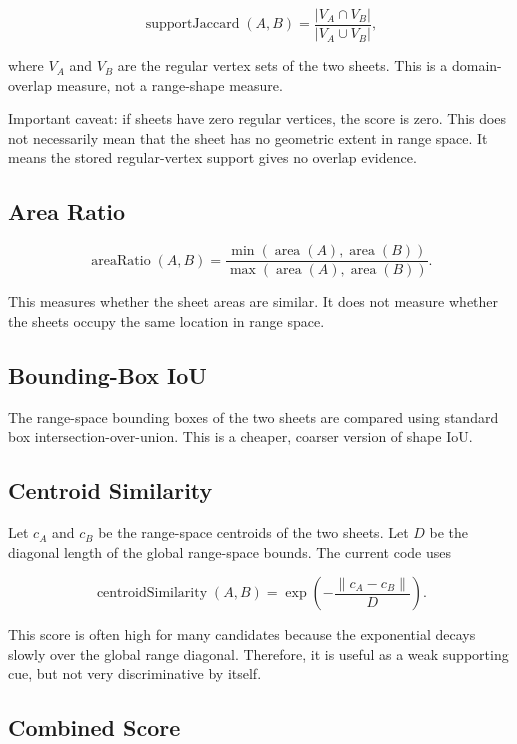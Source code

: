 \documentclass[11pt]{article}
\begin{document}
\[
\operatorname{supportJaccard}(A,B)
=
\frac{|V_A \cap V_B|}{|V_A \cup V_B|},
\]

where \(V_A\) and \(V_B\) are the regular vertex sets of the two sheets. This is
a domain-overlap measure, not a range-shape measure.

Important caveat: if sheets have zero regular vertices, the score is zero. This
does not necessarily mean that the sheet has no geometric extent in range
space. It means the stored regular-vertex support gives no overlap evidence.

\subsection{Area Ratio}

\[
\operatorname{areaRatio}(A,B)
=
\frac{\min(\operatorname{area}(A),\operatorname{area}(B))}
       {\max(\operatorname{area}(A),\operatorname{area}(B))}.
\]

This measures whether the sheet areas are similar. It does not measure whether
the sheets occupy the same location in range space.

\subsection{Bounding-Box IoU}

The range-space bounding boxes of the two sheets are compared using standard
box intersection-over-union. This is a cheaper, coarser version of shape IoU.

\subsection{Centroid Similarity}

Let \(c_A\) and \(c_B\) be the range-space centroids of the two sheets. Let
\(D\) be the diagonal length of the global range-space bounds. The current code
uses

\[
\operatorname{centroidSimilarity}(A,B)
=
\exp\left(-\frac{\|c_A-c_B\|}{D}\right).
\]

This score is often high for many candidates because the exponential decays
slowly over the global range diagonal. Therefore, it is useful as a weak
supporting cue, but not very discriminative by itself.

\subsection{Combined Score}
\end{document}
